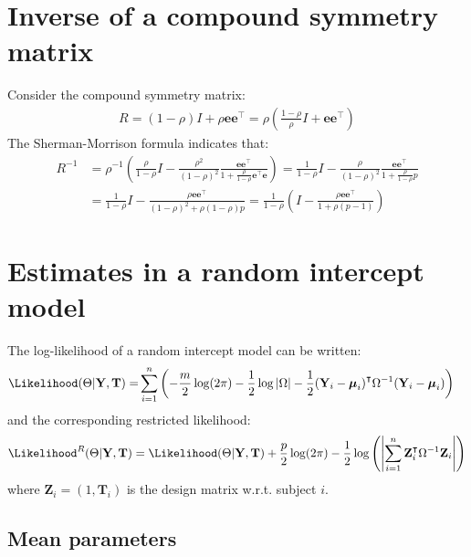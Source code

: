\documentclass[12pt]{article}
\newcommand\Ve{\mathbf{e}}
\newcommand\VT{\mathbf{T}}
\newcommand\VY{\mathbf{Y}}
\newcommand\VZ{\mathbf{Z}}
\newcommand\Vmu{\boldsymbol{\mu}}
\newcommand\trans[1]{{#1}^\intercal}%
\begin{document}
\section{Inverse of a compound symmetry matrix}
\label{sm:invCS}
Consider the compound symmetry matrix:
\begin{align*}
R= (1-\rho) I + \rho \Ve\trans{\Ve}= \rho\left(\frac{1-\rho}{\rho} I + \Ve\trans{\Ve}\right) 
\end{align*}
The Sherman-Morrison formula indicates that:
\begin{align*}
R^{-1} &= \rho^{-1} \left(\frac{\rho}{1-\rho} I - \frac{\rho^2}{(1-\rho)^2}\frac{\Ve\trans{\Ve}}{1+\frac{\rho}{1-\rho}\trans{\Ve}\Ve}\right) = \frac{1}{1-\rho} I - \frac{\rho}{(1-\rho)^2}\frac{\Ve\trans{\Ve}}{1+\frac{\rho}{1-\rho}p} \\
&=  \frac{1}{1-\rho} I - \frac{\rho \Ve\trans{\Ve}}{(1-\rho)^2+\rho(1-\rho)p} =  \frac{1}{1-\rho} \left(I - \frac{\rho \Ve\trans{\Ve}}{1+\rho(p-1)}\right)
\end{align*}

\section{Estimates in a random intercept model}
\label{sm:rhoML}
The log-likelihood of a random intercept model can be written:
\begin{align*}
\Likelihood(\Theta|\VY,\VT) =& \sum_{i=1}^{n} \left(-\frac{m}{2} \log(2\pi) - \frac{1}{2} \log\left|\Omega\right| - \frac{1}{2} \trans{(\VY_i-\Vmu_i)} \Omega^{-1} (\VY_i-\Vmu_i) \right)
\end{align*}
and the corresponding restricted likelihood:
\begin{align*}
\Likelihood^R(\Theta|\VY,\VT) = \Likelihood(\Theta|\VY,\VT) + \frac{p}{2} \log(2\pi)-\frac{1}{2} \log\left(\left|\sum_{i=1}^n \trans{\VZ}_i \Omega^{-1} \VZ_i \right|\right)
\end{align*}
where \(\VZ_i = (1,\VT_i)\) is the design matrix w.r.t. subject \(i\).


\subsection{Mean parameters}
\label{sec:org2c9f087}
\end{document}
